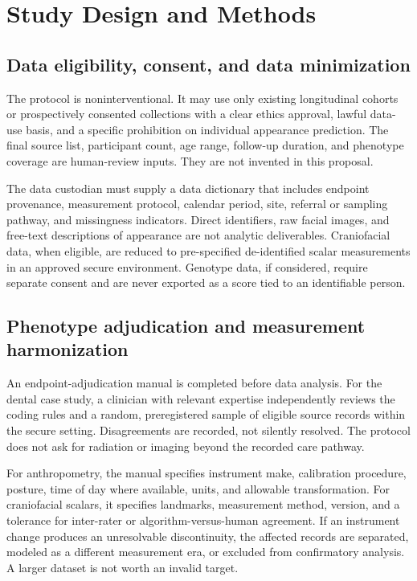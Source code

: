 \documentclass[conference]{IEEEtran}
\begin{document}
\section{Study Design and Methods}

\subsection{Data eligibility, consent, and data minimization}

The protocol is noninterventional. It may use only existing longitudinal
cohorts or prospectively consented collections with a clear ethics approval,
lawful data-use basis, and a specific prohibition on individual appearance
prediction. The final source list, participant count, age range, follow-up
duration, and phenotype coverage are human-review inputs. They are not
invented in this proposal.

The data custodian must supply a data dictionary that includes endpoint
provenance, measurement protocol, calendar period, site, referral or sampling
pathway, and missingness indicators. Direct identifiers, raw facial images,
and free-text descriptions of appearance are not analytic deliverables.
Craniofacial data, when eligible, are reduced to pre-specified de-identified
scalar measurements in an approved secure environment. Genotype data, if
considered, require separate consent and are never exported as a score tied to
an identifiable person.

\subsection{Phenotype adjudication and measurement harmonization}

An endpoint-adjudication manual is completed before data analysis. For the
dental case study, a clinician with relevant expertise independently reviews
the coding rules and a random, preregistered sample of eligible source records
within the secure setting. Disagreements are recorded, not silently resolved.
The protocol does not ask for radiation or imaging beyond the recorded care
pathway.

For anthropometry, the manual specifies instrument make, calibration
procedure, posture, time of day where available, units, and allowable
transformation. For craniofacial scalars, it specifies landmarks, measurement
method, version, and a tolerance for inter-rater or algorithm-versus-human
agreement. If an instrument change produces an unresolvable discontinuity,
the affected records are separated, modeled as a different measurement era,
or excluded from confirmatory analysis. A larger dataset is not worth an
invalid target.
\end{document}
